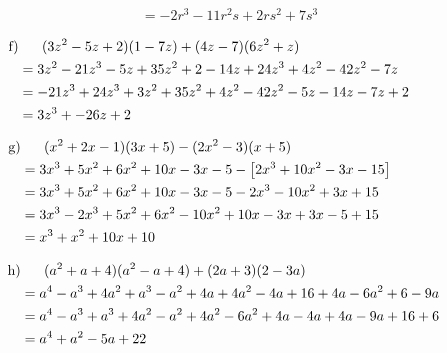 \begin{exercise}
{\begin{equation*}
\begin{split}
                    &=           -2r^3-11r^2s+2rs^2+7s^3
        \end{split}
      \end{equation*}
    }%
    \newcommand{\solutionF}[1]
    {%
      \begin{equation*}
        \begin{split}
          \text{f)} &\toprow[#1]{(3z^2-5z+2)(1-7z)+(4z-7)(6z^2+z)}              \\
                    &=           3z^2-21z^3-5z+35z^2+2-14z+24z^3+4z^2-42z^2-7z  \\
                    &=           -21z^3+24z^3+3z^2+35z^2+4z^2-42z^2-5z-14z-7z+2 \\
                    &=           3z^3+-26z+2
        \end{split}
      \end{equation*}
    }%
    \newcommand{\solutionG}[1]
    {%
      \begin{equation*}
        \begin{split}
          \text{g)} &\toprow[#1]{(x^2+2x-1)(3x+5)-(2x^2-3)(x+5)}                       \\
                    &=           3x^3+5x^2+6x^2+10x-3x-5-\left[2x^3+10x^2-3x-15\right] \\
                    &=           3x^3+5x^2+6x^2+10x-3x-5-2x^3-10x^2+3x+15              \\
                    &=           3x^3-2x^3+5x^2+6x^2-10x^2+10x-3x+3x-5+15              \\
                    &=           x^3+x^2+10x+10
        \end{split}
      \end{equation*}
    }%
    \newcommand{\solutionH}[1]
    {%
      \begin{equation*}
        \begin{split}
          \text{h)} &\toprow[#1]{(a^2+a+4)(a^2-a+4)+(2a+3)(2-3a)}                \\
                    &=           a^4-a^3+4a^2+a^3-a^2+4a+4a^2-4a+16+4a-6a^2+6-9a \\
                    &=           a^4-a^3+a^3+4a^2-a^2+4a^2-6a^2+4a-4a+4a-9a+16+6 \\
                    &=           a^4+a^2-5a+22
        \end{split}
      \end{equation*}
    }%
    {\small
      \solutionA{30em}\par
      \solutionB{30em}\par
      \solutionC{30em}\par
      \solutionD{30em}\par
      \solutionE{30em}\par
      \solutionF{30em}\par
      \solutionG{30em}\par
      \solutionH{30em}\par
    }
  \fi
\end{exercise}
